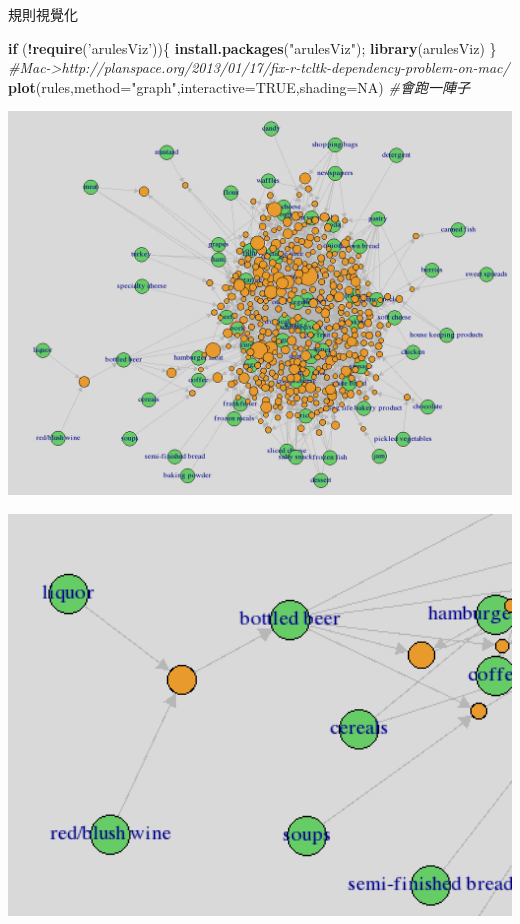 \documentclass[]{book}
\newenvironment{Shaded}{\begin{snugshade}}{\end{snugshade}}
\newcommand{\CommentTok}[1]{\textcolor[rgb]{0.56,0.35,0.01}{\textit{#1}}}
\newcommand{\ControlFlowTok}[1]{\textcolor[rgb]{0.13,0.29,0.53}{\textbf{#1}}}
\newcommand{\DataTypeTok}[1]{\textcolor[rgb]{0.13,0.29,0.53}{#1}}
\newcommand{\KeywordTok}[1]{\textcolor[rgb]{0.13,0.29,0.53}{\textbf{#1}}}
\newcommand{\NormalTok}[1]{#1}
\newcommand{\OperatorTok}[1]{\textcolor[rgb]{0.81,0.36,0.00}{\textbf{#1}}}
\newcommand{\OtherTok}[1]{\textcolor[rgb]{0.56,0.35,0.01}{#1}}
\newcommand{\StringTok}[1]{\textcolor[rgb]{0.31,0.60,0.02}{#1}}
\begin{document}
規則視覺化

\begin{Shaded}
\begin{Highlighting}[]
\ControlFlowTok{if}\NormalTok{ (}\OperatorTok{!}\KeywordTok{require}\NormalTok{(}\StringTok{'arulesViz'}\NormalTok{))\{}
  \KeywordTok{install.packages}\NormalTok{(}\StringTok{"arulesViz"}\NormalTok{); }
  \KeywordTok{library}\NormalTok{(arulesViz)}
\NormalTok{\}}
\CommentTok{#Mac->http://planspace.org/2013/01/17/fix-r-tcltk-dependency-problem-on-mac/}
\KeywordTok{plot}\NormalTok{(rules,}\DataTypeTok{method=}\StringTok{"graph"}\NormalTok{,}\DataTypeTok{interactive=}\OtherTok{TRUE}\NormalTok{,}\DataTypeTok{shading=}\OtherTok{NA}\NormalTok{) }\CommentTok{#會跑一陣子}
\end{Highlighting}
\end{Shaded}

\includegraphics[width=14.75in]{figure/arulesViz}

\includegraphics[width=5.38in]{figure/arulesVizBig}
\end{document}
